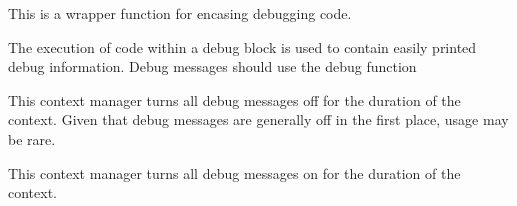 \documentclass[letterpaper,10pt,english]{sphinxmanual}
\begin{document}

\begin{fulllineitems}
\label{\detokenize{docstrings/ifa_smeargle.core.error:ifa_smeargle.core.error.ifas_debug_block}}
This is a wrapper function for encasing debugging code.

The execution of code within a debug block is used to contain
easily printed debug information. Debug messages should use the
debug function {\hyperref[\detokenize{docstrings/ifa_smeargle.core.error:ifa_smeargle.core.error.ifas_debug}]{}}

\end{fulllineitems}


\begin{fulllineitems}
\label{\detokenize{docstrings/ifa_smeargle.core.error:ifa_smeargle.core.error.ifas_disable_debug}}
This context manager turns all debug messages off for the
duration of the context. Given that debug messages are generally
off in the first place, usage may be rare.

\end{fulllineitems}


\begin{fulllineitems}
\label{\detokenize{docstrings/ifa_smeargle.core.error:ifa_smeargle.core.error.ifas_enable_debug}}
This context manager turns all debug messages on for the
duration of the context.

\end{fulllineitems}

\end{document}
